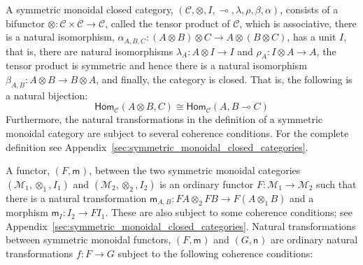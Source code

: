 \documentclass{article}
\let\mto\to
\let\to\rightarrow
\newcommand{\cat}[1]{\mathcal{#1}}
\newcommand{\Hom}[2]{\mathsf{Hom}_{#1}(#2)}
\newcommand{\m}[1]{\mathsf{m}_{#1}}
\newcommand{\n}[1]{\mathsf{n}_{#1}}
\newcommand{\limp}[0]{\multimap}
\begin{document}
A symmetric monoidal closed category, $(\cat{C}, \otimes, I, \limp,
\lambda, \rho, \beta, \alpha)$, consists of a bifunctor $\otimes :
\cat{C} \times \cat{C} \to \cat{C}$, called the tensor product of
$\cat{C}$, which is associative, there is a natural isomorphism,
$\alpha_{A,B,C} : (A \otimes B) \otimes C \to A \otimes (B \otimes
C)$, has a unit $I$, that is, there are natural isomorphisms
$\lambda_A : A \otimes I \to I$ and $\rho_A : I \otimes A \to A$, the
tensor product is symmetric and hence there is a natural isomorphism
$\beta_{A,B} : A \otimes B \to B \otimes A$, and finally, the category
is closed.  That is, the following is a natural bijection:
\[
\Hom{\cat{C}}{A \otimes B,C} \cong \Hom{\cat{C}}{A, B \limp C}
\]
Furthermore, the natural transformations in the definition of a
symmetric monoidal category are subject to several coherence
conditions.  For the complete definition see
Appendix~\ref{sec:symmetric_monoidal_closed_categories}.

A functor, $(F,\m{})$, between the two symmetric monoidal categories
$(\cat{M}_1, \otimes_1, I_1)$ and $(\cat{M}_2, \otimes_2, I_2)$ is an
ordinary functor $F : \cat{M}_1 \mto \cat{M}_2$ such that there is a
natural transformation $\m{A,B} : FA \otimes_2 FB \mto F(A \otimes_1
B)$ and a morphism $\m{I} : I_2 \mto FI_1$.  These are also subject to
some coherence conditions; see
Appendix~\ref{sec:symmetric_monoidal_closed_categories}.  Natural
transformations between symmetric monoidal functors, $(F, \m{})$ and
$(G, \n{})$ are ordinary natural transformations $f : F \to G$ subject
to the following coherence conditions:
\end{document}
